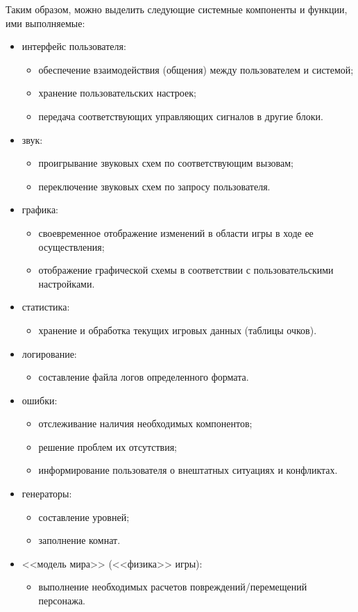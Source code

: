 \documentclass[12pt,a4paper,fullpage,titlepage]{article}
\begin{document}
Таким образом, можно выделить следующие системные компоненты и функции, ими выполняемые:
\begin{itemize}
	\item интерфейс пользователя:
	\begin{itemize}
		\item обеспечение взаимодействия (общения) между пользователем и системой;
		\item хранение пользовательских настроек;
		\item передача соответствующих управляющих сигналов в другие блоки.
	\end{itemize}
	\item звук:
	\begin{itemize}
		\item проигрывание звуковых схем по соответствующим вызовам;
		\item переключение звуковых схем по запросу пользователя.
	\end{itemize}
	\item графика:
	\begin{itemize}
		\item своевременное отображение изменений в области игры в ходе ее осуществления;
		\item отображение графической схемы в соответствии с пользовательскими настройками.
	\end{itemize}
	\item статистика:
	\begin{itemize}
		\item хранение и обработка текущих игровых данных (таблицы очков).
	\end{itemize}
	\item логирование:
	\begin{itemize}
		\item составление файла логов определенного формата.\\
	\end{itemize}
	\item ошибки:
	\begin{itemize}
		\item отслеживание наличия необходимых компонентов;
		\item решение проблем их отсутствия;
		\item информирование пользователя о внештатных ситуациях и конфликтах.
	\end{itemize}
	\item генераторы:
	\begin{itemize}
		\item составление уровней;
		\item заполнение комнат.
	\end{itemize}
	\item <<модель мира>> (<<физика>> игры):
	\begin{itemize}
		\item выполнение необходимых расчетов повреждений/перемещений персонажа.
	\end{itemize}
\end{itemize}
\end{document}
